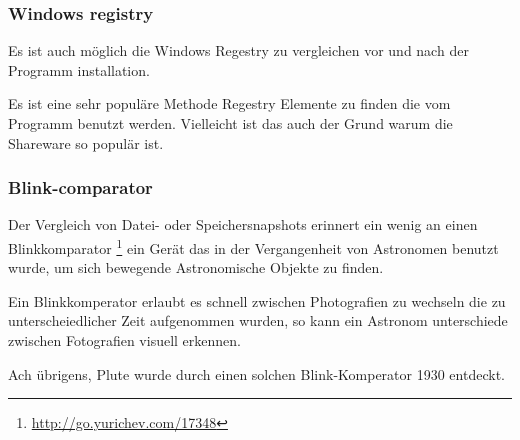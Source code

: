 

\subsubsection{Windows registry}

Es ist auch möglich die Windows Regestry zu vergleichen vor und nach der Programm installation.

Es ist eine sehr populäre Methode Regestry Elemente zu finden die vom Programm benutzt werden.
Vielleicht ist das auch der Grund warum die  Shareware so populär ist.

\subsubsection{Blink-comparator}

Der Vergleich von Datei- oder Speichersnapshots erinnert ein wenig an einen Blinkkomparator
\footnote{\url{http://go.yurichev.com/17348}}
ein Gerät das in der Vergangenheit von Astronomen benutzt wurde, um sich bewegende Astronomische
Objekte zu finden.


Ein Blinkkomperator erlaubt es schnell zwischen Photografien zu wechseln die zu unterscheiedlicher
Zeit aufgenommen wurden, so kann ein Astronom unterschiede zwischen Fotografien visuell erkennen.


Ach übrigens, Plute wurde durch einen solchen Blink-Komperator 1930 entdeckt.
